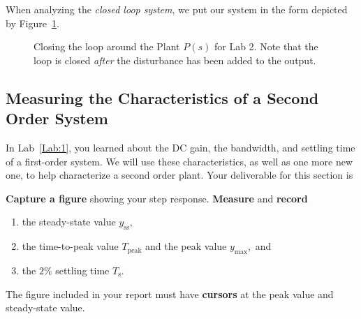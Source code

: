 When analyzing the \emph{closed loop system}, we put our system in the form
depicted by Figure~\ref{fig:lab2:closing-loop}.
%
\begin{figure}
  \centering
  \caption{
    Closing the loop around the Plant \(P(s)\) for Lab 2. Note that the
    loop is closed \emph{after} the disturbance has been added to the output.
  }
  \label{fig:lab2:closing-loop}
\end{figure}
%

\subsection{Measuring the Characteristics of a Second Order System}
In Lab~\ref{Lab:1}, you learned about the DC gain, the bandwidth, and
settling time of a first-order system.
We will use these characteristics, as well as one more new one, to help
characterize a second order plant.
%
Your deliverable for this section is
%
\begin{deliverable}[label={lab2:d1}]
  \textbf{Capture a figure} showing your step response. \textbf{Measure} and
  \textbf{record}
  \begin{enumerate}[label=(\arabic*)]
    \item{the steady-state value \(y_{\mathrm{ss}},\)}
    \item{
      the time-to-peak value \(T_{\mathrm{peak}}\) and
      the peak value \(y_{\mathrm{max}},\) and
    }
    \item{
      the \(2\%\) settling time \(T_{\mathrm{s}}.\)
    }
  \end{enumerate}
  The figure included in your report must have \textbf{cursors} at the peak
  value and steady-state value.
\end{deliverable}
%

